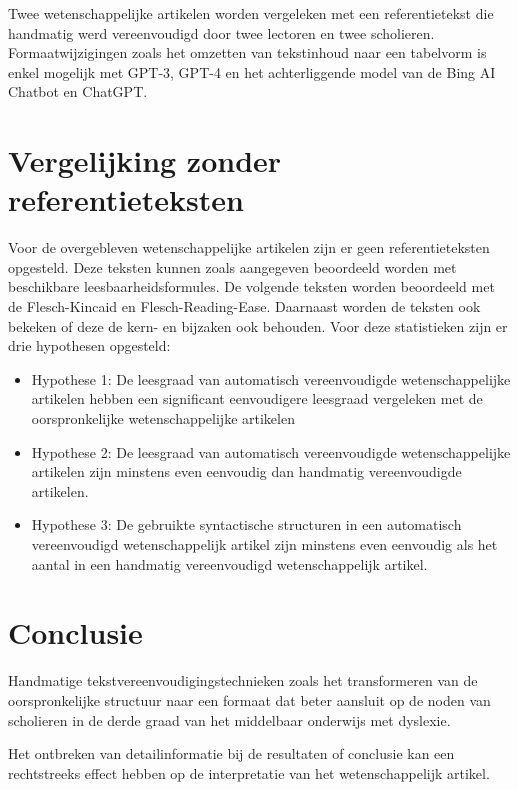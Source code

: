 Twee wetenschappelijke artikelen worden vergeleken met een referentietekst die handmatig werd vereenvoudigd door twee lectoren en twee scholieren. Formaatwijzigingen zoals het omzetten van tekstinhoud naar een tabelvorm is enkel mogelijk met GPT-3, GPT-4 en het achterliggende model van de Bing AI Chatbot en ChatGPT. 

\section{Vergelijking zonder referentieteksten}

Voor de overgebleven wetenschappelijke artikelen zijn er geen referentieteksten opgesteld. Deze teksten kunnen zoals aangegeven beoordeeld worden met beschikbare leesbaarheidsformules. De volgende teksten worden beoordeeld met de Flesch-Kincaid en Flesch-Reading-Ease. Daarnaast worden de teksten ook bekeken of deze de kern- en bijzaken ook behouden. Voor deze statistieken zijn er drie hypothesen opgesteld:

\begin{itemize}
	\item Hypothese 1: De leesgraad van automatisch vereenvoudigde wetenschappelijke artikelen hebben een significant eenvoudigere leesgraad vergeleken met de oorspronkelijke wetenschappelijke artikelen
	
	\item Hypothese 2: De leesgraad van automatisch vereenvoudigde wetenschappelijke artikelen zijn minstens even eenvoudig dan handmatig vereenvoudigde artikelen.
	
	\item Hypothese 3: De gebruikte syntactische structuren in een automatisch vereenvoudigd wetenschappelijk artikel zijn minstens even eenvoudig als het aantal in een handmatig vereenvoudigd wetenschappelijk artikel.
\end{itemize} 

\section{Conclusie}


Handmatige tekstvereenvoudigingstechnieken zoals het transformeren van de oorspronkelijke structuur naar een formaat dat beter aansluit op de noden van scholieren in de derde graad van het middelbaar onderwijs met dyslexie. 

% 
Het ontbreken van detailinformatie bij de resultaten of conclusie kan een rechtstreeks effect hebben op de interpretatie van het wetenschappelijk artikel.